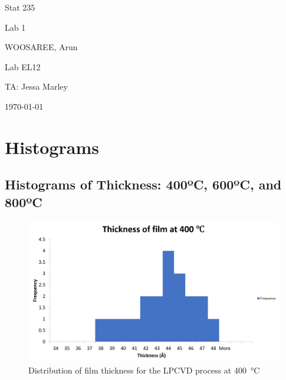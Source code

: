 \documentclass[letterpaper]{article}
\begin{document}
\begin{titlepage}
 \begin{center}
  \vspace*{1cm}
  \Huge
  Stat 235
  \vspace{1cm}
  
  Lab 1
  \vspace{1cm}
  
  WOOSAREE, Arun
  \vspace{1cm}
  
  \Huge
  Lab EL12
  \vspace{1cm}
  
  TA: Jessa Marley
  \vspace{1cm}
  
  \today
  \vfill
 \end{center}
\end{titlepage}

\section{Histograms}

\subsection{Histograms of Thickness: 400ºC, 600ºC, and 800ºC}

\begin{figure}[H]
 \centering
 \includegraphics[width=\textwidth]{thicc400.png}
 \caption{Distribution of film thickness for the LPCVD process at \SI{400}{\celsius}}
 \label{thicc400}
\end{figure}
\end{document}
